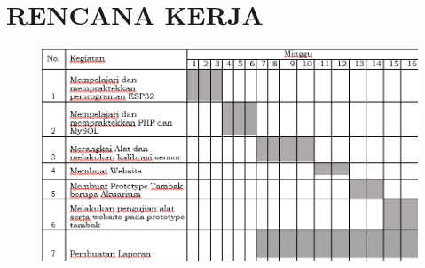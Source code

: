 \section{RENCANA KERJA}
\begin{figure}[ht]
  \centering

  \includegraphics[scale=0.7]{gambar/rencana.png}

  \label{fig:rencana}
\end{figure}